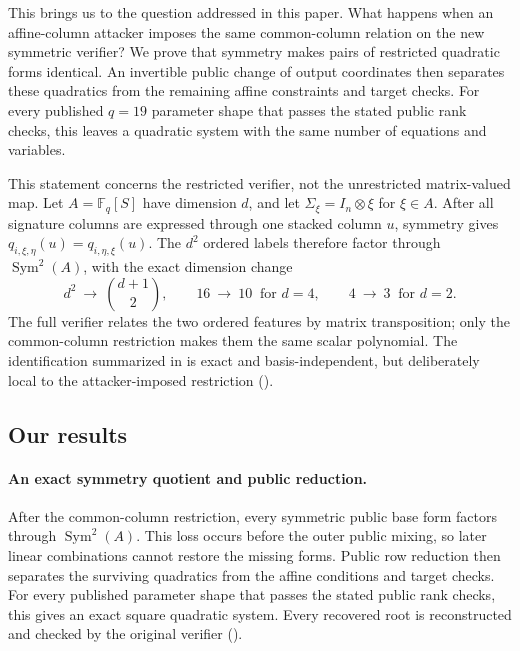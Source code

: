 \documentclass[11pt]{article}
\newcommand{\F}{\mathbb F}
\newcommand{\Sym}{\operatorname{Sym}}
\begin{document}
This brings us to the question addressed in this paper.  What happens when an
affine-column attacker imposes the same common-column relation on the new
symmetric verifier?  We prove that symmetry makes pairs of restricted
quadratic forms identical.  An invertible public change of output coordinates
then separates these quadratics from the remaining affine constraints and
target checks.  For every published $q=19$ parameter shape that passes the
stated public rank checks, this leaves a quadratic system with the same number
of equations and variables.

This statement concerns the restricted verifier, not the unrestricted
matrix-valued map.  Let $A=\F_q[S]$ have dimension $d$, and let
$\Sigma_\xi=I_n\otimes\xi$ for $\xi\in A$.  After all signature columns are
expressed through one stacked column $u$, symmetry gives
$q_{i,\xi,\eta}(u)=q_{i,\eta,\xi}(u)$.  The $d^2$ ordered labels therefore
factor through $\Sym^2(A)$, with the exact dimension change
\begin{equation}
 d^2\ \longrightarrow\ \binom{d+1}{2},
 \qquad 16\ \longrightarrow\ 10\ \text{ for }d=4,
 \qquad 4\ \longrightarrow\ 3\ \text{ for }d=2.
 \label{eq:intro-duplication}
\end{equation}
The full verifier relates the two ordered features by matrix transposition;
only the common-column restriction makes them the same scalar polynomial.
The identification summarized in  is exact and
basis-independent, but deliberately local to the attacker-imposed
restriction ().

\subsection{Our results}

\paragraph{An exact symmetry quotient and public reduction.}
After the common-column restriction, every symmetric public base form factors
through $\Sym^2(A)$.  This loss occurs before the outer public mixing, so later
linear combinations cannot restore the missing forms.  Public row reduction
then separates the surviving quadratics from the affine conditions and target
checks.  For every published parameter shape that passes the stated public
rank checks, this gives an exact square quadratic system.  Every recovered
root is reconstructed and checked by the original verifier
().
\end{document}
